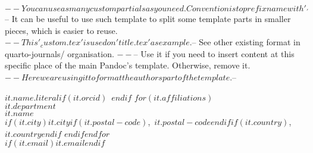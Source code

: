 $-- You can use as many custom partials as you need. Convention is to prefix name with '_'
$-- It can be useful to use such template to split some template parts in smaller pieces, which is easier to reuse.
$-- This '_custom.tex' is used on 'title.tex' as example.
$-- See other existing format in quarto-journals/ organisation.
$-- %
$-- Use it if you need to insert content at this specific place of the main Pandoc's template. Otherwise, remove it.
$-- Here we are using it to format the authors part of the template.
$-- %

\textbf{$it.name.literal$}$if(it.orcid)$~$endif$
$for(it.affiliations)$\\$it.department$\\$it.name$\\$if(it.city)$$it.city$$if(it.postal-code)$,\ $it.postal-code$$endif$$if(it.country)$,\ $it.country$$endif$
$endif$$endfor$\\
$if(it.email)$\href{mailto:$it.email$}{$it.email$}$endif$
